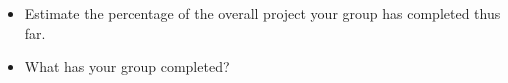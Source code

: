 \begin{itemize}
	\item Estimate the percentage of the overall project your group has completed thus far.
	\item What has your group completed?
\end{itemize}